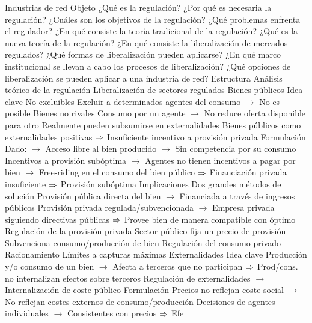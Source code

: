 \documentclass{nuevotema}
\begin{document}
\begin{esquemal}
				\4[] Industrias de red
		\2 Objeto
			\3 ¿Qué es la regulación?
			\3 ¿Por qué es necesaria la regulación?
			\3 ¿Cuáles son los objetivos de la regulación?
			\3 ¿Qué problemas enfrenta el regulador?
			\3 ¿En qué consiste la teoría tradicional de la regulación?
			\3 ¿Qué es la nueva teoría de la regulación?
			\3 ¿En qué consiste la liberalización de mercados regulados?
			\3 ¿Qué formas de liberalización pueden aplicarse?
			\3 ¿En qué marco institucional se llevan a cabo los procesos de liberalización?
			\3 ¿Qué opciones de liberalización se pueden aplicar a una industria de red?
		\2 Estructura
			\3 Análisis teórico de la regulación
			\3 Liberalización de sectores regulados
	\1 
		\2 Bienes públicos
			\3 Idea clave
				\4 No excluibles
				\4[] Excluir a determinados agentes del consumo
				\4[] $\to$ No es posible
				\4 Bienes no rivales
				\4[] Consumo por un agente
				\4[] $\to$ No reduce oferta disponible para otro
				\4 Realmente pueden subsumirse en externalidades
				\4[] Bienes públicos como externalidades positivas
				\4[] $\Rightarrow$ Insuficiente incentivo a provisión privada
			\3 Formulación
				\4 Dado:
				\4[] $\to$ Acceso libre al bien producido
				\4[] $\to$ Sin competencia por su consumo
				\4 Incentivos a provisión subóptima
				\4[] $\to$ Agentes no tienen incentivos a pagar por bien
				\4[] $\to$ Free-riding en el consumo del bien público
				\4[] $\Rightarrow$ Financiación privada insuficiente
				\4[] $\Rightarrow$ Provisión subóptima
			\3 Implicaciones
				\4 Dos grandes métodos de solución
				\4[] Provisión pública directa del bien
				\4[] $\to$ Financiada a través de ingresos públicos
				\4[] Provisión privada regulada/subvencionada
				\4[] $\to$ Empresa privada siguiendo directivas públicas
				\4[] $\Rightarrow$ Provee bien de manera compatible con óptimo
				\4 Regulación de la provisión privada
				\4[] Sector público fija un precio de provisión
				\4[] Subvenciona consumo/producción de bien
				\4 Regulación del consumo privado
				\4[] Racionamiento
				\4[] Límites a capturas máximas
		\2 Externalidades
			\3 Idea clave
				\4 Producción y/o consumo de un bien
				\4[] $\to$ Afecta a terceros que no participan
				\4[] $\Rightarrow$ Prod/cons. no internalizan efectos sobre terceros
				\4 Regulación de externalidades
				\4[] $\to$ Internalización de coste público
			\3 Formulación
				\4 Precios no reflejan coste social
				\4[] $\to$ No reflejan costes externos de consumo/producción
				\4 Decisiones de agentes individuales
				\4[] $\to$ Consistentes con precios
				\4[] $\Rightarrow$ Efe

\end{esquemal}
\end{document}
